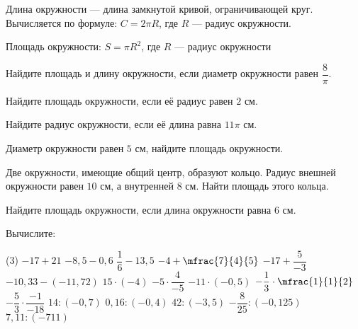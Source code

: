\begin{class}[number=3-4]
	\begin{definit}
		Длина окружности --- длина замкнутой кривой, ограничивающей круг. Вычисляется по формуле: \( C = 2 \pi R \), где \(R\) --- радиус окружности.
	\end{definit}
	\begin{definit}
		Площадь окружности: \( S = \pi R^2 \), где \(R\) --- радиус окружности
	\end{definit}
	\begin{listofex}
		\item Найдите площадь и длину окружности, если диаметр окружности равен \( \dfrac{8}{\pi} \).
		\item Найдите площадь окружности, если её радиус равен \( 2 \) см.
		\item Найдите радиус окружности, если её длина равна \( 11\pi \) см.
		\item Диаметр окружности равен \(5\) см, найдите площадь окружности.
		\item Две окружности, имеющие общий центр, образуют кольцо. Радиус внешней окружности равен \(10\) см, а внутренней \(8\) см. Найти площадь этого кольца.
		\item Найдите площадь окружности, если длина окружности равна \(6\) см.
		\item Вычислите:
		\begin{tasks}(3)
			\task \( -17 + 21 \)
			\task \( -8,5 - 0,6 \)
			\task \( \dfrac{1}{6} - 13,5 \)
			\task \( -4 + \mfrac{7}{4}{5} \)
			\task \( -17 + \dfrac{5}{-3} \)
			\task \( -10,33 - (-11,72) \)
			\task \( 15 \cdot (-4) \)
			\task \( -5 \cdot \dfrac{4}{-5} \)
			\task \( -11 \cdot (-0,5) \)
			\task \( -\dfrac{1}{3} \cdot \mfrac{1}{1}{2} \)
			\task \( -\dfrac{5}{3}\cdot \dfrac{-1}{-18} \)
			\task \( 14 : (-0,7) \)
			\task \( 0,16 : (-0,4) \)
			\task \( 42 : (-3,5) \)
			\task \( -\dfrac{8}{25} : (-0,125) \)
			\task \( 7,11 : (-711) \)
		\end{tasks}
	\end{listofex}
\end{class}

